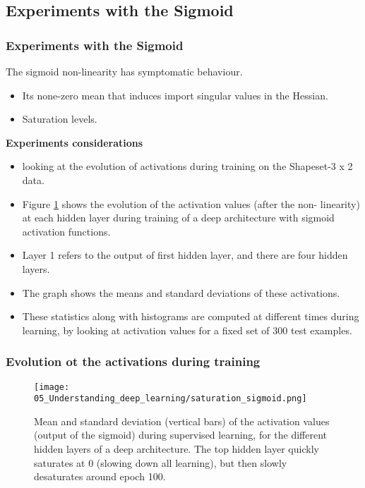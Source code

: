 \subsection{Experiments with the Sigmoid}
\begin{frame}
  \frametitle{Experiments with the Sigmoid}

    The sigmoid non-linearity has symptomatic behaviour.
    
    \begin{itemize}
      \item Its none-zero mean that induces import singular values in the Hessian. 
      \item Saturation levels. 
    \end{itemize} 

    \textbf{Experiments considerations}

    \begin{itemize}
      \item looking at the evolution of activations during training on the Shapeset-3 x 2 data.
      
      \item  Figure \ref{fig:saturation-sigmoid-shapeset3x2} shows the evolution of the activation values (after the non- linearity) at each hidden layer during training of a deep architecture with sigmoid activation functions. 
      
      \item Layer 1 refers to the output of first hidden layer, and there are four hidden layers. 
      
      \item The graph shows the means and standard deviations of these activations. 
      
      \item These statistics along with histograms are computed at different times during learning, by looking at activation values for a fixed set of 300 test examples. 
    \end{itemize}
\end{frame}

\begin{frame}
  \frametitle{Evolution ot the activations during training}
\begin{figure}[t]
  \centering
  \texttt{[image: 05\_Understanding\_deep\_learning/saturation\_sigmoid.png]}
  \caption{Mean and standard deviation (vertical bars) of the activation values (output of the sigmoid) during supervised learning, for the different hidden layers of a deep architecture. The top hidden layer quickly saturates at 0 (slowing down all learning), but then slowly desaturates around epoch 100.}
  \label{fig:saturation-sigmoid-shapeset3x2}
\end{figure}

\end{frame}

